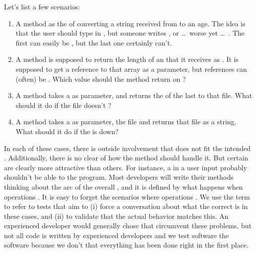 Let's list a few scenarios:
\begin{enumerate}
  \item A method as the  of converting a string received from  to an age. The idea is that the user should type in , but someone writes , or \ldots\ worse yet \ldots\ . The first can easily be , but the last one certainly can't.
  \item A method is supposed to return the length of an  that it receives as . It is supposed to get a reference to that array as a parameter, but references can (often) be . Which value should the method return on ?
  \item A method takes a  as parameter, and returns the  of the last  to that file. What should it do if the file doesn't ?
  \item A method takes a  as parameter,  the file and returns that file as a string. What should it do if the  is down?
\end{enumerate}

In each of these cases, there is outside involvement that does not fit the intended . Additionally, there is no clear  of how the method should handle it. But certain  are clearly more attractive than others. For instance, a  in a user input probably shouldn't be able to  the program. Most developers will write their methods thinking about the arc of the overall , and it is defined by what happens when operations . It is easy to forget the scenarios where operations . We use the term  to refer to tests that aim to (i) force a conversation about what the correct  is in these cases, and (ii) to validate that the actual behavior matches this. An experienced developer would generally chose  that circumvent these problems, but not all code is written by experienced developers and we test software the software because we don't  that everything has been done right in the first place.

